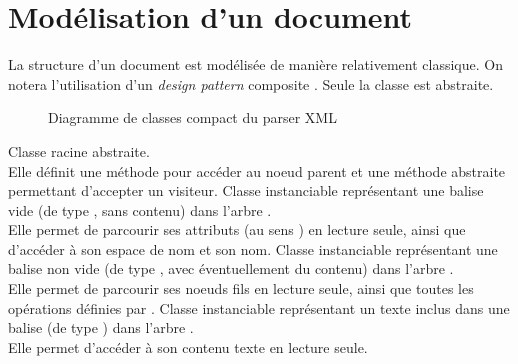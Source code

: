 \section{Modélisation d'un document \xml}
La structure d'un document \xml est modélisée de manière relativement classique. On notera l'utilisation d'un \emph{design pattern} \og composite \fg.
Seule la classe  est abstraite.
\begin{figure}[H]
\caption{Diagramme de classes compact du parser XML}
\end{figure}

Classe racine abstraite. \\
Elle définit une méthode pour accéder au noeud parent et une méthode abstraite permettant d'accepter un visiteur.
Classe instanciable représentant une balise vide (de type , sans contenu) dans l'arbre \xml. \\
Elle permet de parcourir ses attributs (au sens \xml) en lecture seule, ainsi que d'accéder à son espace de nom et son nom.
Classe instanciable représentant une balise non vide (de type , avec éventuellement du contenu) dans l'arbre \xml. \\
Elle permet de parcourir ses noeuds fils en lecture seule, ainsi que toutes les opérations définies par .
Classe instanciable représentant un texte inclus dans une balise (de type ) dans l'arbre \xml. \\
Elle permet d'accéder à son contenu texte en lecture seule.
